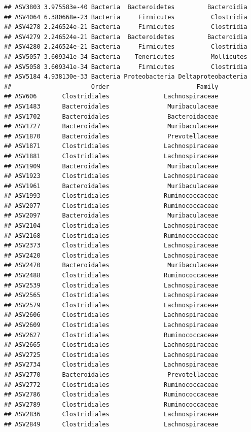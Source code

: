\documentclass[]{article}
\begin{document}
\begin{verbatim}
## ASV3803 3.975583e-40 Bacteria  Bacteroidetes         Bacteroidia
## ASV4064 6.380668e-23 Bacteria     Firmicutes          Clostridia
## ASV4278 2.246524e-21 Bacteria     Firmicutes          Clostridia
## ASV4279 2.246524e-21 Bacteria  Bacteroidetes         Bacteroidia
## ASV4280 2.246524e-21 Bacteria     Firmicutes          Clostridia
## ASV5057 3.609341e-34 Bacteria    Tenericutes          Mollicutes
## ASV5058 3.609341e-34 Bacteria     Firmicutes          Clostridia
## ASV5184 4.938130e-33 Bacteria Proteobacteria Deltaproteobacteria
##                      Order                        Family
## ASV606       Clostridiales               Lachnospiraceae
## ASV1483      Bacteroidales                Muribaculaceae
## ASV1702      Bacteroidales                Bacteroidaceae
## ASV1727      Bacteroidales                Muribaculaceae
## ASV1870      Bacteroidales                Prevotellaceae
## ASV1871      Clostridiales               Lachnospiraceae
## ASV1881      Clostridiales               Lachnospiraceae
## ASV1909      Bacteroidales                Muribaculaceae
## ASV1923      Clostridiales               Lachnospiraceae
## ASV1961      Bacteroidales                Muribaculaceae
## ASV1993      Clostridiales               Ruminococcaceae
## ASV2077      Clostridiales               Ruminococcaceae
## ASV2097      Bacteroidales                Muribaculaceae
## ASV2104      Clostridiales               Lachnospiraceae
## ASV2168      Clostridiales               Ruminococcaceae
## ASV2373      Clostridiales               Lachnospiraceae
## ASV2420      Clostridiales               Lachnospiraceae
## ASV2470      Bacteroidales                Muribaculaceae
## ASV2488      Clostridiales               Ruminococcaceae
## ASV2539      Clostridiales               Lachnospiraceae
## ASV2565      Clostridiales               Lachnospiraceae
## ASV2579      Clostridiales               Lachnospiraceae
## ASV2606      Clostridiales               Lachnospiraceae
## ASV2609      Clostridiales               Lachnospiraceae
## ASV2627      Clostridiales               Ruminococcaceae
## ASV2665      Clostridiales               Lachnospiraceae
## ASV2725      Clostridiales               Lachnospiraceae
## ASV2734      Clostridiales               Lachnospiraceae
## ASV2770      Bacteroidales                Prevotellaceae
## ASV2772      Clostridiales               Ruminococcaceae
## ASV2786      Clostridiales               Ruminococcaceae
## ASV2789      Clostridiales               Ruminococcaceae
## ASV2836      Clostridiales               Lachnospiraceae
## ASV2849      Clostridiales               Lachnospiraceae

\end{verbatim}
\end{document}
